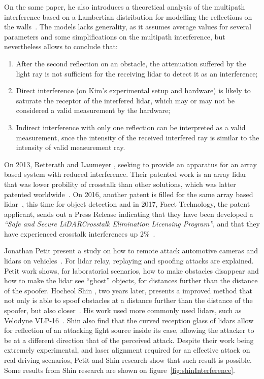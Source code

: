 On the same paper, he also introduces a theoretical analysis of the multipath interference based on a Lambertian distribution for modelling the reflections on the walls~\cite{Kim2017}. The models lacks generality, as it assumes average values for several parameters and some simplifications on the multipath interference, but nevertheless allows to conclude that:

\begin{enumerate}
	\item After the second reflection on an obstacle, the attenuation suffered by the light ray is not sufficient for the receiving \ac{lidar} to detect it as an interference;
	\item Direct interference (on Kim's experimental setup and hardware) is likely to saturate the receptor of the interfered \ac{lidar}, which may or may not be considered a valid measurement by the hardware;
	\item Indirect interference with only one reflection can be interpreted as a valid measurement, snce the intensity of the received interfered ray is similar to the intensity of valid measurement ray.
\end{enumerate}

On 2013, Retterath and Laumeyer \cite{Retterath2015}, seeking to provide an apparatus for an array based system with reduced interference. Their patented work is an array \ac{lidar} that was lower probility of crosstalk than other solutions, which was latter patented worldwide~\cite{Retterath2015WO}. On 2016, another patent is filled for the same array based \ac{lidar}~\cite{Retterath2016}, this time for object detection and in 2017, Facet Technology, the patent applicant, sends out a Press Release indicating that they have been developed a \textit{``Safe and Secure LiDAR\textregistered Crosstalk Elimination Licensing Program''}, and that they have experienced crosstalk interferences up 2\%~\cite{Facet}.

Jonathan Petit \etal present a study on how to remote attack automotive cameras and \acp{lidar} on vehicles~\cite{Petit2015}. For \ac{lidar} relay, replaying and spoofing attacks are explained. Petit work shows, for laboratorial scenarios, how to make obstacles disappear and how to make the \ac{lidar} see ``ghost'' objects, for distances further than the distance of the spoofer. Hocheol Shin \etal, two years later, presents a improved method that not only is able to spoof obstacles at a distance further than the distance of the spoofer, but also closer~\cite{Shin2017}. His work used more commonly used \acp{lidar}, such as Velodyne VLP-16~\cite{vlp16}. Shin \etal also find that the curved reception glass of \acp{lidar} allow for reflection of an attacking light source inside its case, allowing the attacker to be at a different direction that of the perceived attack. Despite their work being extremely experimental, and laser alignment required for an effective attack on real driving scenarios, Petit \etal and Shin \etal research show that such result is possible. Some results from Shin research are shown on figure~\ref{fig:shinInterference}.

